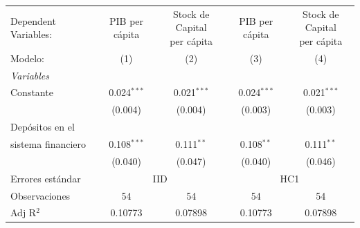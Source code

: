 \begingroup
\centering
\begin{tabular}{lcccc}
   \tabularnewline \midrule \midrule
   Dependent Variables:                    & PIB per cápita & \makecell{Stock de Capital \\per cápita}    & PIB per cápita & \makecell{Stock de Capital \\per cápita}\\     
   Modelo:                                  & (1)            & (2)                                         & (3)            & (4)\\  
   \midrule
   \emph{Variables}\\
   Constante                                & 0.024$^{***}$  & 0.021$^{***}$                               & 0.024$^{***}$  & 0.021$^{***}$\\   
                                           & (0.004)        & (0.004)                                     & (0.003)        & (0.003)\\   
   Depósitos en el \\ sistema financiero   & 0.108$^{***}$  & 0.111$^{**}$                                & 0.108$^{**}$   & 0.111$^{**}$\\   
                                           & (0.040)        & (0.047)                                     & (0.040)        & (0.046)\\   
   \midrule
   Errores estándar & \multicolumn{2}{c}{IID} & \multicolumn{2}{c}{HC1} \\ 
   Observaciones                            & 54             & 54                                          & 54             & 54\\  
   Adj R$^2$                          & 0.10773        & 0.07898                                     & 0.10773        & 0.07898\\  
   \midrule \midrule
\end{tabular}
\par\endgroup

